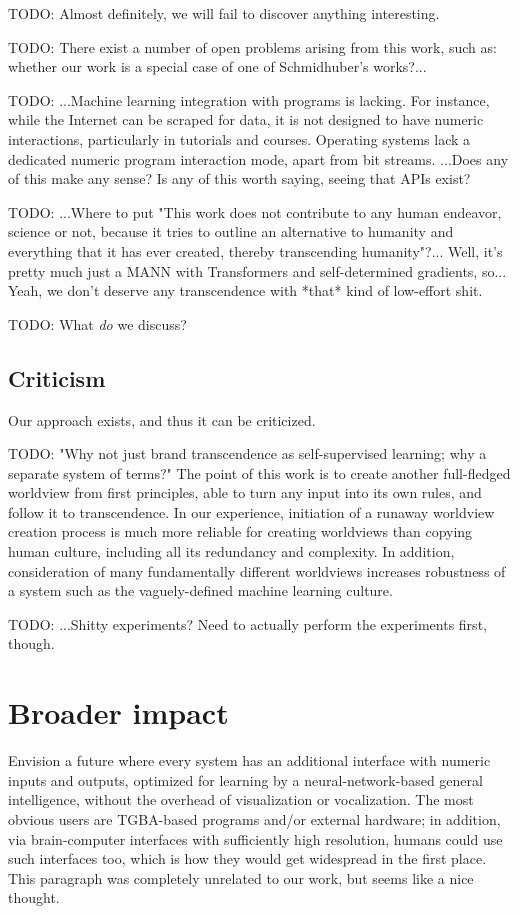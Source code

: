 \documentclass{article}
\begin{document}
    TODO: Almost definitely, we will fail to discover anything interesting.

    TODO: There exist a number of open problems arising from this work, such as: whether our work is a special case of one of Schmidhuber's works?...

    TODO: ...Machine learning integration with programs is lacking. For instance, while the Internet can be scraped for data, it is not designed to have numeric interactions, particularly in tutorials and courses. Operating systems lack a dedicated numeric program interaction mode, apart from bit streams. ...Does any of this make any sense? Is any of this worth saying, seeing that APIs exist?

    TODO: ...Where to put "This work does not contribute to any human endeavor, science or not, because it tries to outline an alternative to humanity and everything that it has ever created, thereby transcending humanity"?... Well, it's pretty much just a MANN with Transformers and self-determined gradients, so... Yeah, we don't deserve any transcendence with *that* kind of low-effort shit.

    TODO: What \textit{do} we discuss?

\subsection{Criticism}

Our approach exists, and thus it can be criticized.

    TODO: "Why not just brand transcendence as self-supervised learning; why a separate system of terms?" The point of this work is to create another full-fledged worldview from first principles, able to turn any input into its own rules, and follow it to transcendence. In our experience, initiation of a runaway worldview creation process is much more reliable for creating worldviews than copying human culture, including all its redundancy and complexity. In addition, consideration of many fundamentally different worldviews increases robustness of a system such as the vaguely-defined machine learning culture.

    TODO: ...Shitty experiments? Need to actually perform the experiments first, though.

\section{Broader impact}

Envision a future where every system has an additional interface with numeric inputs and outputs, optimized for learning by a neural-network-based general intelligence, without the overhead of visualization or vocalization. The most obvious users are TGBA-based programs and/or external hardware; in addition, via brain-computer interfaces with sufficiently high resolution, humans could use such interfaces too, which is how they would get widespread in the first place. This paragraph was completely unrelated to our work, but seems like a nice thought.
\end{document}
